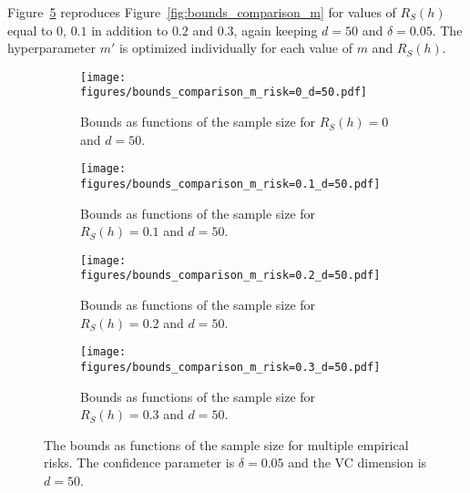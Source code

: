 \documentclass[twoside,11pt]{article}
\begin{document}
Figure~\ref{fig:bounds_comp_ms_app} reproduces Figure~\ref{fig:bounds_comparison_m} for values of $R_S(h)$ equal to $0$, $0.1$ in addition to $0.2$ and $0.3$, again keeping $d=50$ and $\delta=0.05$.
The hyperparameter $m'$ is optimized individually for each value of $m$ and $R_S(h)$.



\begin{figure}[p]
\centering
\begin{subfigure}[t]{0.485\textwidth}
    \centering
    \texttt{[image: figures/bounds\_comparison\_m\_risk=0\_d=50.pdf]}
    \caption{Bounds as functions of the sample size for $R_S(h)=0$ and $d=50$.}
    \label{fig:bounds_comp_m_risk=0_d=50_app}
\end{subfigure}\hfill
\begin{subfigure}[t]{0.485\textwidth}
    \centering
    \texttt{[image: figures/bounds\_comparison\_m\_risk=0.1\_d=50.pdf]}
    \caption{Bounds as functions of the sample size for $R_S(h)=0.1$ and $d=50$.}
    \label{fig:bounds_comp_m_risk=0.1_d=50_app}
\end{subfigure}

\begin{subfigure}[t]{0.485\textwidth}
    \centering
    \texttt{[image: figures/bounds\_comparison\_m\_risk=0.2\_d=50.pdf]}
    \caption{Bounds as functions of the sample size for $R_S(h)=0.2$ and $d=50$.}
    \label{fig:bounds_comp_m_risk=0.2_d=50}
\end{subfigure}\hfill
\begin{subfigure}[t]{0.485\textwidth}
    \centering
    \texttt{[image: figures/bounds\_comparison\_m\_risk=0.3\_d=50.pdf]}
    \caption{Bounds as functions of the sample size for $R_S(h)=0.3$ and $d=50$.}
    \label{fig:bounds_comp_m_risk=0.3_d=50}
\end{subfigure}
\caption{The bounds as functions of the sample size for multiple empirical risks.
The confidence parameter is $\delta=0.05$ and the VC dimension is $d=50$.}
\label{fig:bounds_comp_ms_app}
\end{figure}
\end{document}
